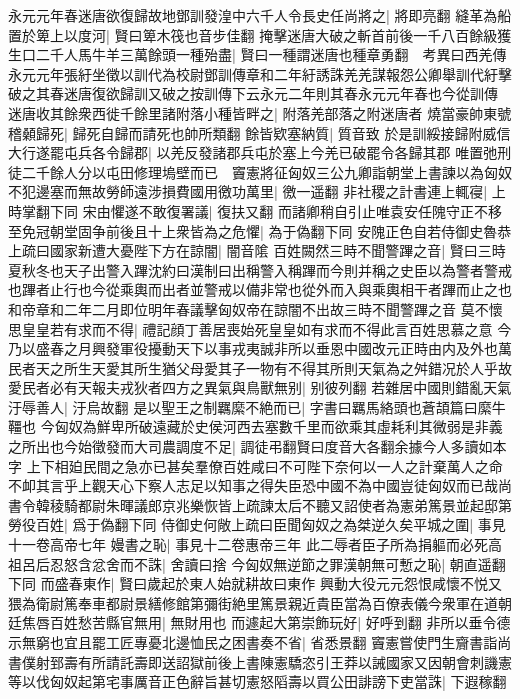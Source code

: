 永元元年春迷唐欲復歸故地鄧訓發湟中六千人令長史任尚將之|{
	將即亮翻}
縫革為船置於箄上以度河|{
	賢曰箄木筏也音步佳翻}
掩擊迷唐大破之斬首前後一千八百餘級獲生口二千人馬牛羊三萬餘頭一種殆盡|{
	賢曰一種謂迷唐也種章勇翻　考異曰西羌傳永元元年張紆坐徵以訓代為校尉鄧訓傳章和二年紆誘誅羌羌謀報怨公卿舉訓代紆擊破之其春迷唐復欲歸訓又破之按訓傳下云永元二年則其春永元元年春也今從訓傳}
迷唐收其餘衆西徙千餘里諸附落小種皆畔之|{
	附落羌部落之附迷唐者}
燒當豪帥東號稽顙歸死|{
	歸死自歸而請死也帥所類翻}
餘皆欵塞納質|{
	質音致}
於是訓綏接歸附威信大行遂罷屯兵各令歸郡|{
	以羌反發諸郡兵屯於塞上今羌已破罷令各歸其郡}
唯置弛刑徒二千餘人分以屯田修理塢壁而已　竇憲將征匈奴三公九卿詣朝堂上書諫以為匈奴不犯邊塞而無故勞師遠涉損費國用徼功萬里|{
	徼一遥翻}
非社稷之計書連上輒寑|{
	上時掌翻下同}
宋由懼遂不敢復署議|{
	復扶又翻}
而諸卿稍自引止唯袁安任隗守正不移至免冠朝堂固争前後且十上衆皆為之危懼|{
	為于偽翻下同}
安隗正色自若侍御史魯恭上疏曰國家新遭大憂陛下方在諒闇|{
	闇音隂}
百姓闕然三時不聞警蹕之音|{
	賢曰三時夏秋冬也天子出警入蹕沈約曰漢制曰出稱警入稱蹕而今則并稱之史臣以為警者警戒也蹕者止行也今從乘輿而出者並警戒以備非常也從外而入與乘輿相干者蹕而止之也和帝章和二年二月即位明年春議擊匈奴帝在諒闇不出故三時不聞警蹕之音}
莫不懷思皇皇若有求而不得|{
	禮記顔丁善居喪始死皇皇如有求而不得此言百姓思慕之意}
今乃以盛春之月興發軍役擾動天下以事戎夷誠非所以垂恩中國改元正時由内及外也萬民者天之所生天愛其所生猶父母愛其子一物有不得其所則天氣為之舛錯况於人乎故愛民者必有天報夫戎狄者四方之異氣與鳥獸無别|{
	别彼列翻}
若雜居中國則錯亂天氣汙辱善人|{
	汙烏故翻}
是以聖王之制羈縻不絶而已|{
	字書曰羈馬絡頭也蒼頡篇曰縻牛韁也}
今匈奴為鮮卑所破遠藏於史侯河西去塞數千里而欲乘其虛耗利其微弱是非義之所出也今始徵發而大司農調度不足|{
	調徒弔翻賢曰度音大各翻余據今人多讀如本字}
上下相廹民間之急亦已甚矣羣僚百姓咸曰不可陛下奈何以一人之計棄萬人之命不卹其言乎上觀天心下察人志足以知事之得失臣恐中國不為中國豈徒匈奴而已哉尚書令韓稜騎都尉朱暉議郎京兆樂恢皆上疏諫太后不聽又詔使者為憲弟篤景並起邸第勞役百姓|{
	爲于偽翻下同}
侍御史何敞上疏曰臣聞匈奴之為桀逆久矣平城之圍|{
	事見十一卷高帝七年}
嫚書之恥|{
	事見十二卷惠帝三年}
此二辱者臣子所為捐軀而必死高祖呂后忍怒含忿舍而不誅|{
	舍讀曰捨}
今匈奴無逆節之罪漢朝無可慙之恥|{
	朝直遥翻下同}
而盛春東作|{
	賢曰歲起於東人始就耕故曰東作}
興動大役元元怨恨咸懷不悦又猥為衛尉篤奉車都尉景繕修館第彌街絶里篤景親近貴臣當為百僚表儀今衆軍在道朝廷焦唇百姓愁苦縣官無用|{
	無財用也}
而遽起大第崇飾玩好|{
	好呼到翻}
非所以垂令德示無窮也宜且罷工匠專憂北邊恤民之困書奏不省|{
	省悉景翻}
竇憲嘗使門生齎書詣尚書僕射郅壽有所請託壽即送詔獄前後上書陳憲驕恣引王莽以誡國家又因朝會刺譏憲等以伐匈奴起第宅事厲音正色辭旨甚切憲怒䧟壽以買公田誹謗下吏當誅|{
	下遐稼翻}
